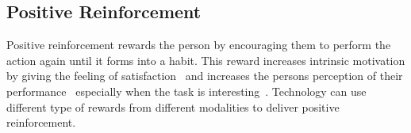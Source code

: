 \subsection{Positive Reinforcement}
Positive reinforcement rewards the person by encouraging them to perform the action again until it forms into a habit. This reward increases intrinsic motivation by giving the feeling of satisfaction~\cite{article_promoting_habit_formation} and increases the persons perception of their performance~\cite{positive_reinforcement_pro} especially when the task is interesting~\cite{article_meta_analytic_review_intrinsic_motivation}. Technology can use different type of rewards from different modalities to deliver positive reinforcement.


